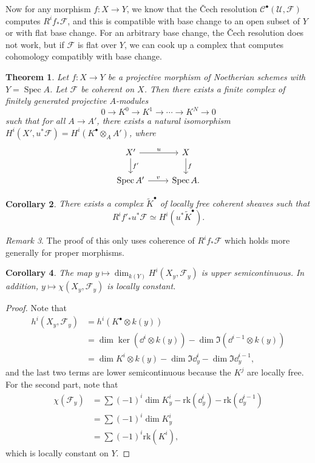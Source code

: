 \documentclass[leqno, openany]{memoir}
\newtheorem{thm}{Theorem}[section]
\newtheorem{cor}[thm]{Corollary}
\theoremstyle{definition}
\theoremstyle{remark}
\newtheorem{rmk}[thm]{Remark}
\theoremstyle{plain}
\theoremstyle{definition}
\theoremstyle{remark}
\newcommand{\mc}[1]{\mathcal{#1}}
\newcommand{\mr}[1]{\mathrm{#1}}
\newcommand{\wt}[1]{\widetilde{#1}}
\DeclareMathOperator{\Spec}{Spec}
\begin{document}
Now for any morphism $f \colon X \to Y$, we know that the \v{C}ech resolution $\mc{C}^{\bullet}(\mc{U}, \mc{F})$ computes $R^i f_* \mc{F}$, and this is compatible with base change to an open subset of $Y$ or with flat base change. For an arbitrary base change, the \v{C}ech resolution does not work, but if $\mc{F}$ is flat over $Y$, we can cook up a complex that computes cohomology compatibly with base change.

\begin{thm}
    Let $f \colon X \to Y$ be a projective morphism of Noetherian schemes with $Y = \Spec A$. Let $\mc{F}$ be coherent on $X$. Then there exists a finite complex of finitely generated projective $A$-modules
    \[ 0 \to K^0 \to K^1 \to \cdots \to K^N \to 0 \]
    such that for all $A \to A'$, there exists a natural isomorphism $H^i(X', u^* \mc{F}) = H^i(K^{\bullet} \otimes_A A')$, where
    \begin{equation*}
    \begin{tikzcd}
        X' \ar{r}{u} \ar{d}{f'} & X \ar{d}{f} \\
        \Spec A' \ar{r}{v} & \Spec A.
    \end{tikzcd}
    \end{equation*}
\end{thm}

\begin{cor}
    There exists a complex $\wt{K}^{\bullet}$ of locally free coherent sheaves such that
    \[ R^i f'_* u^* \mc{F} \simeq H^i(u^* \wt{K}^{\bullet}). \]
\end{cor}

\begin{rmk}
    The proof of this only uses coherence of $R^i f_* \mc{F}$ which holds more generally for proper morphisms.
\end{rmk}

\begin{cor}
    The map $y \mapsto \dim_{k(Y)} H^i(X_y, \mc{F}_y)$ is upper semicontinuous. In addition, $y \mapsto \chi(X_y, \mc{F}_y)$ is locally constant.
\end{cor}

\begin{proof}
    Note that
    \begin{align*}
        h^i(X_y, \mc{F}_y) &= h^i(K^{\bullet} \otimes k(y)) \\
                           &= \dim \ker (\dd^i \otimes k(y)) - \dim \Im (\dd^{i-1} \otimes k(y)) \\
                           &= \dim K^i \otimes k(y) - \dim \Im \dd_y^i - \dim \Im \dd_y^{i-1},
    \end{align*}
    and the last two terms are lower semicontinuous because the $K^j$ are locally free. For the second part, note that
    \begin{align*}
        \chi(\mc{F}_y) &= \sum {(-1)}^i \dim K_y^i - \mr{rk}(\dd_y^i) - \mr{rk}(\dd_y^{i-1}) \\
                       &= \sum {(-1)}^i \dim K_y^i \\
                       &= \sum {(-1)}^i \mr{rk}(K^i),
    \end{align*}
    which is locally constant on $Y$.
\end{proof}
\end{document}
